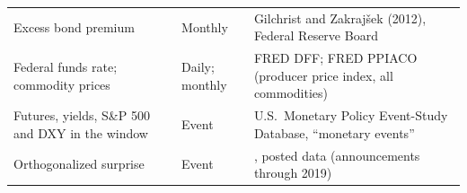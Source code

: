 \documentclass[11pt]{article}
\begin{document}
\begin{appendices}
\begin{table}[tp]
\begin{tabular}{p{}p{}p{}}
Excess bond premium & Monthly & Gilchrist and Zakrajšek (2012), Federal Reserve Board \\
Federal funds rate; commodity prices & Daily; monthly & FRED DFF; FRED PPIACO (producer price index, all commodities) \\
Futures, yields, S\&P 500 and DXY in the window & Event & U.S.\ Monetary Policy Event-Study Database, ``monetary events'' \citep{acosta2025} \\
Orthogonalized surprise & Event & \citet{bauer2023}, posted data (announcements through 2019) \\
\end{tabular}
\end{table}

\end{appendices}
\end{document}
